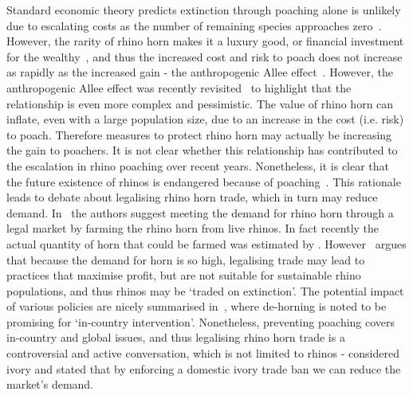\documentclass[10pt]{article}
\begin{document}
Standard economic theory predicts extinction through poaching alone is unlikely due to
escalating costs as the number of remaining species approaches zero~\cite{courchamp2006rarity}.
However, the rarity of rhino horn makes it a luxury good, or financial investment
for the wealthy~\cite{gao2016rhino}, and thus the increased cost and risk to poach
does not increase as rapidly as the increased gain - the anthropogenic
Allee effect~\cite{branch2013opportunistic, courchamp2006rarity}. However, the
anthropogenic Allee effect was recently revisited~\cite{holden2017high} to highlight
that the relationship is even more complex and pessimistic. The value of rhino horn
can inflate, even with a large population size, due to an increase in the cost (i.e. risk)
to poach. Therefore measures to protect rhino horn may actually be increasing the gain
to poachers. It is not clear whether this relationship has contributed to the escalation
in rhino poaching over recent years. Nonetheless, it is clear that the future
existence of rhinos is endangered because of poaching~\cite{Duan2013,Smith1993}.
This rationale leads to debate about legalising rhino horn trade, which in turn may
reduce demand. In~\cite{Duan2013} the authors suggest meeting the demand for rhino horn
through a legal market by farming the rhino horn from live rhinos. In fact recently
the actual quantity of horn that could be farmed was estimated by \cite{Taylor2017}.
However~\cite{crookes2016trading} argues that because the demand for horn is so high,
legalising trade may lead to practices that maximise profit, but are not suitable for
sustainable rhino populations, and thus rhinos may be `traded on extinction'.
The potential impact of various policies are nicely summarised in~\cite{crookes2016categorisation},
where de-horning is noted to be promising for `in-country intervention'. Nonetheless,
preventing poaching covers in-country and global issues, and thus legalising rhino
horn trade is a controversial and active conversation, which is not limited to rhinos -
\cite{Harvey2017} considered ivory and stated that by enforcing a domestic ivory
trade ban we can reduce the market's demand.
\end{document}

